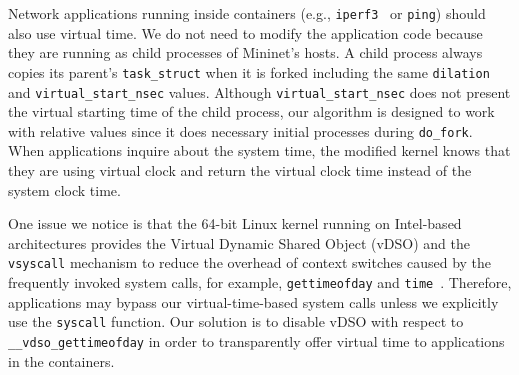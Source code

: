 \label{VT:SubSec:ModificationApplications}
Network applications running inside containers (e.g., \texttt{iperf3}~\cite{iperf3} or \texttt{ping}) should also use virtual time. 
We do not need to modify the application code because they are running as child processes of Mininet's hosts. 
A child process always copies its parent's \texttt{task\_struct} when it is forked including the same \texttt{dilation} and \texttt{virtual\_start\_nsec} values. 
Although \texttt{virtual\_start\_nsec} does not present the virtual starting time of the child process,
our algorithm is designed to work with relative values since it does necessary initial processes during \texttt{do\_fork}. 
When applications inquire about the system time,
the modified kernel knows that they are using virtual clock and return the virtual clock time instead of the system clock time.

One issue we notice is that the 64-bit Linux kernel running on Intel-based architectures provides the Virtual Dynamic Shared Object (vDSO)
and the \texttt{vsyscall} mechanism to reduce the overhead of context switches caused by the frequently invoked system calls,
for example, \texttt{gettimeofday} and \texttt{time}~\cite{VDSO}. 
Therefore, applications may bypass our virtual-time-based system calls unless we explicitly use the \texttt{syscall} function.
Our solution is to disable vDSO with respect to \texttt{\_\_vdso\_gettimeofday} in order to transparently offer virtual time to applications in the containers.

